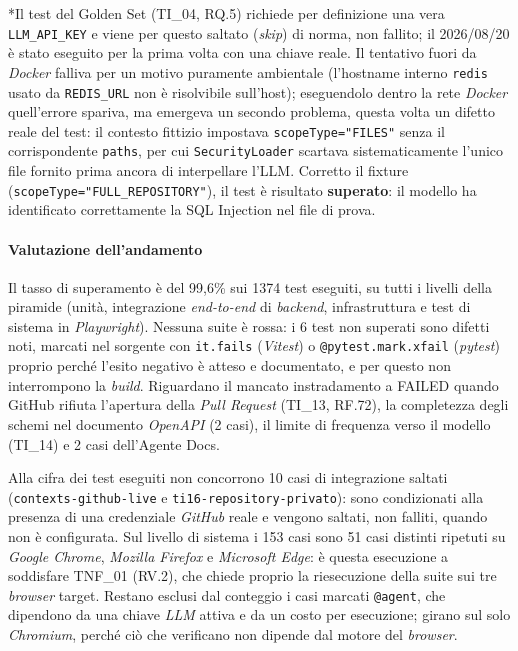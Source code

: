 \documentclass[12pt, a4paper]{article}
\begin{document}
*Il test del Golden Set (TI\_04, RQ.5) richiede per definizione una vera \texttt{LLM\_API\_KEY} e viene per questo saltato (\textit{skip}) di norma, non fallito; il 2026/08/20 è stato eseguito per la prima volta con una chiave reale. Il tentativo fuori da \textit{Docker} falliva per un motivo puramente ambientale (l'hostname interno \texttt{redis} usato da \texttt{REDIS\_URL} non è risolvibile sull'host); eseguendolo dentro la rete \textit{Docker} quell'errore spariva, ma emergeva un secondo problema, questa volta un difetto reale del test: il contesto fittizio impostava \texttt{scopeType="FILES"} senza il corrispondente \texttt{paths}, per cui \texttt{SecurityLoader} scartava sistematicamente l'unico file fornito prima ancora di interpellare l'LLM. Corretto il fixture (\texttt{scopeType="FULL\_REPOSITORY"}), il test è risultato \textbf{superato}: il modello ha identificato correttamente la SQL Injection nel file di prova.

\paragraph*{Valutazione dell'andamento}
Il tasso di superamento è del 99,6\% sui 1374 test eseguiti, su tutti i livelli della piramide (unità, integrazione \textit{end-to-end} di \textit{backend}, infrastruttura e test di sistema in \textit{Playwright}). Nessuna suite è rossa: i 6 test non superati sono difetti noti, marcati nel sorgente con \texttt{it.fails} (\textit{Vitest}) o \texttt{@pytest.mark.xfail} (\textit{pytest}) proprio perché l'esito negativo è atteso e documentato, e per questo non interrompono la \textit{build}. Riguardano il mancato instradamento a FAILED quando GitHub rifiuta l'apertura della \textit{Pull Request} (TI\_13, RF.72), la completezza degli schemi nel documento \textit{OpenAPI} (2 casi), il limite di frequenza verso il modello (TI\_14) e 2 casi dell'Agente Docs.

Alla cifra dei test eseguiti non concorrono 10 casi di integrazione saltati (\texttt{contexts-github-live} e \texttt{ti16-repository-privato}): sono condizionati alla presenza di una credenziale \textit{GitHub} reale e vengono saltati, non falliti, quando non è configurata. Sul livello di sistema i 153 casi sono 51 casi distinti ripetuti su \textit{Google Chrome}, \textit{Mozilla Firefox} e \textit{Microsoft Edge}: è questa esecuzione a soddisfare TNF\_01 (RV.2), che chiede proprio la riesecuzione della suite sui tre \textit{browser} target. Restano esclusi dal conteggio i casi marcati \texttt{@agent}, che dipendono da una chiave \textit{LLM} attiva e da un costo per esecuzione; girano sul solo \textit{Chromium}, perché ciò che verificano non dipende dal motore del \textit{browser}.
\end{document}

